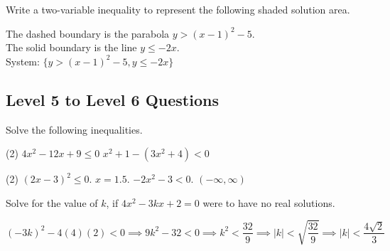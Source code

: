 \documentclass[12pt]{exam}
\begin{document}
\begin{questions}

\question Write a two-variable inequality to represent the following shaded solution area.
   \begin{flushright}
    \end{flushright}
\begin{solution}
    The dashed boundary is the parabola $y > (x-1)^2 - 5$. \\
    The solid boundary is the line $y \leq -2x$. \\
    System: $\{y > (x-1)^2 - 5, y \leq -2x\}$
\end{solution}
\pagebreak

\subsection*{Level 5 to Level 6 Questions}
\question Solve the following inequalities.
\begin{tasks}(2)
    \task $4x^2-12x+9\leq0$ \task $x^2+1-(3x^2+4)<0$
\end{tasks}
\begin{solution}
\begin{tasks}(2)
    \task $(2x-3)^2 \leq 0$. $x = 1.5$.
    \task $-2x^2 - 3 < 0$. $(-\infty, \infty)$
\end{tasks}
\end{solution}

\question Solve for the value of $k$, if $4x^2-3kx+2=0$ were to have no real solutions.
\begin{solution}
    \[ (-3k)^2 - 4(4)(2) < 0 \implies 9k^2 - 32 < 0 \implies  k^2 < \frac{32}{9} \implies |k| < \sqrt{\frac{32}{9}}\implies |k| < \frac{4\sqrt{2}}{3} \]


\end{solution}
\end{questions}
\end{document}
